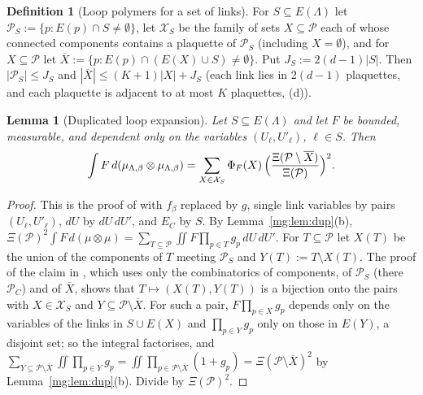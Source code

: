 \documentclass[11pt,a4paper]{article}
\newtheorem{lemma}[theorem]{Lemma}
\theoremstyle{definition}
\newtheorem{definition}[theorem]{Definition}
\theoremstyle{remark}
\newcommand{\cP}{\mathcal{P}}
\newcommand{\cX}{\mathcal{X}}
\newcommand{\IIIref}[3]{\cite[#1~`#2' (\texttt{#3})]{III}}
\newcommand{\IIIlab}[2]{\cite[#1 \texttt{#2}]{III}}
\begin{document}
\begin{definition}[Loop polymers for a set of links]\label{mg:def:loop}
For $S\subseteq E(\Lambda)$ let $\cP_S:=\{p:E(p)\cap S\neq\emptyset\}$, let $\cX_S$ be the family of sets $X\subseteq\cP$ each of
whose connected components contains a plaquette of $\cP_S$ (including $X=\emptyset$), and for $X\subseteq\cP$ let
$\overline X:=\{p:E(p)\cap(E(X)\cup S)\neq\emptyset\}$. Put $J_S:=2(d-1)|S|$. Then $|\cP_S|\le J_S$ and
$|\overline X|\le(K+1)|X|+J_S$ (each link lies in $2(d-1)$ plaquettes, and each plaquette is adjacent to at most $K$ plaquettes,
\IIIlab{Lemma}{al:lem:facts}(d)).
\end{definition}

\begin{lemma}[Duplicated loop expansion]\label{mg:lem:loopexp}
Let $S\subseteq E(\Lambda)$ and let $F$ be bounded, measurable, and dependent only on the variables $(U_\ell,U'_\ell)$,
$\ell\in S$. Then
\[
\int F\,d(\mu_{\Lambda,\beta}\otimes\mu_{\Lambda,\beta})=\sum_{X\in\cX_S}\Phi_F(X)\,\Bigl(\frac{\Xi(\cP\setminus\overline X)}{\Xi(\cP)}\Bigr)^2 .
\]
\end{lemma}

\begin{proof}
This is the proof of \IIIref{Lemma}{Loop expansion}{al:lem:loopexp} with $f_\beta$ replaced by $g$, single link variables by
pairs $(U_\ell,U'_\ell)$, $dU$ by $dU\,dU'$, and $E_C$ by $S$. By Lemma~\ref{mg:lem:dup}(b),
$\Xi(\cP)^2\int F\,d(\mu\otimes\mu)=\sum_{T\subseteq\cP}\iint F\prod_{p\in T}g_p\,dU\,dU'$. For $T\subseteq\cP$ let $X(T)$ be the union of
the components of $T$ meeting $\cP_S$ and $Y(T):=T\setminus X(T)$. The proof of the claim in \IIIlab{Lemma}{al:lem:loopexp}, which
uses only the combinatorics of components, of $\cP_S$ (there $\cP_C$) and of $\overline X$, shows that $T\mapsto(X(T),Y(T))$ is a
bijection onto the pairs with $X\in\cX_S$ and $Y\subseteq\cP\setminus\overline X$. For such a pair, $F\prod_{p\in X}g_p$ depends only on
the variables of the links in $S\cup E(X)$ and $\prod_{p\in Y}g_p$ only on those in $E(Y)$, a disjoint set; so the integral factorises,
and $\sum_{Y\subseteq\cP\setminus\overline X}\iint\prod_{p\in Y}g_p=\iint\prod_{p\in\cP\setminus\overline X}(1+g_p)=\Xi(\cP\setminus\overline X)^2$
by Lemma~\ref{mg:lem:dup}(b). Divide by $\Xi(\cP)^2$.
\end{proof}
\end{document}
